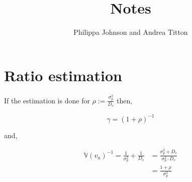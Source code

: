 \documentclass[american]{scrartcl}
\title{Notes}
\author{Philippa Johnson and Andrea Titton}
\newcommand{\V}{\mathbb{V}}
\begin{document}
\maketitle

\section{Ratio estimation}

If the estimation is done for $\rho :=  \frac{\sigma^2_p}{D_v}$ then,

\begin{equation}
    \gamma = \left( 1 + \rho \right)^{-1}
\end{equation}

and,

\begin{equation}
    \begin{split}
        \V(v_u)^{-1} = \frac{1}{\sigma^2_p} + \frac{1}{D_v} &= \frac{\sigma^2_p + D_v}{\sigma^2_p \cdot D_v} \\
        &= \frac{1 + \rho}{\sigma^2_p}
    \end{split}
\end{equation}
\end{document}
